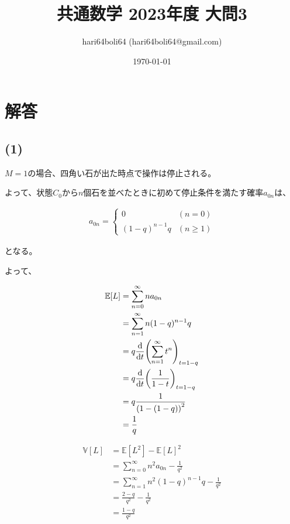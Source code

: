 \documentclass[a4paper, 10pt, dvipdfmx]{jlreq}
\begin{document}
\title{共通数学 2023年度 大問3}
\author{hari64boli64 (hari64boli64@gmail.com)}
\date{\today}
\maketitle

\section{解答}

\subsection*{(1)}

$M=1$の場合、四角い石が出た時点で操作は停止される。

よって、状態$C_0$から$n$個石を並べたときに初めて停止条件を満たす確率$a_{0n}$は、

\begin{align*}
    a_{0n} =
    \begin{cases}
        0            & (n = 0   ) \\
        (1-q)^{n-1}q & (n \geq 1)
    \end{cases}
\end{align*}

となる。

よって、

\begin{align*}
    \mathbb{E}[L] & = \sum_{n=0}^{\infty} na_{0n}                   \\
                  & = \sum_{n=1}^{\infty} n(1-q)^{n-1}q             \\
                  & = q\dv{t}\qty(\sum_{n=1}^{\infty}{t^n})_{t=1-q} \\
                  & = q\dv{t}\qty(\frac{1}{1-t})_{t=1-q}            \\
                  & = q\frac{1}{\qty(1-(1-q))^2}                    \\
                  & = \frac{1}{q}                                   \\
\end{align*}


\begin{align*}
    \mathbb{V}[L] & = \mathbb{E}[L^2] - \mathbb{E}[L]^2                   \\
                  & = \sum_{n=0}^{\infty} n^2a_{0n} - \frac{1}{q^2}       \\
                  & = \sum_{n=1}^{\infty} n^2(1-q)^{n-1}q - \frac{1}{q^2} \\
                  & = \frac{2-q}{q^2}-\frac{1}{q^2}                       \\
                  & = \frac{1-q}{q^2}                                     \\
\end{align*}
\end{document}
